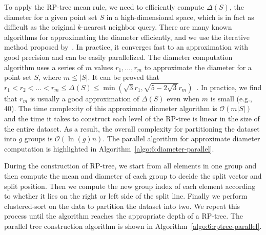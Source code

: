 To apply the RP-tree mean rule, we need to efficiently compute $\Delta(S)$, the diameter for a given point set $S$ in a high-dimensional space, which is in fact as difficult as the original $k$-nearest neighbor query. There are many known algorithms for approximating the diameter efficiently, and we use the iterative method proposed by~\cite{Egecioglu:1989:ADS}. In practice, it converges fast to an approximation with good precision and can be easily parallelized. The diameter computation algorithm uses a series of $m$ values $r_1, ..., r_m$ to approximate the diameter for a point set $S$, where $m \leq |S|$. It can be proved that $r_1 < r_2 < ... < r_m \leq \Delta(S) \leq \min(\sqrt{3}r_1, \sqrt{5-2\sqrt{3}}r_m)$~\cite{Egecioglu:1989:ADS}. In practice, we find that $r_m$ is usually a good approximation of $\Delta(S)$ even when $m$ is small (e.g., 40). The time complexity of this approximate diameter algorithm is $\mathcal O(m|S|)$ and the time it takes to construct each level of the RP-tree is linear in the size of the entire dataset. As a result, the overall complexity for partitioning the dataset into $g$ groups is $\mathcal O(\ln(g) n)$. The parallel algorithm for approximate diameter computation is highlighted in Algorithm~\ref{algo:6:diameter-parallel}.

During the construction of RP-tree, we start from all elements in one group and then compute the mean and diameter of each group to decide the split vector and split position. Then we compute the new group index of each element according to whether it lies on the right or left side of the split line. Finally we perform clustered-sort on the data to partition the dataset into two. We repeat this process until the algorithm reaches the appropriate depth of a RP-tree. The parallel tree construction algorithm is shown in Algorithm~\ref{algo:6:rptree-parallel}.

